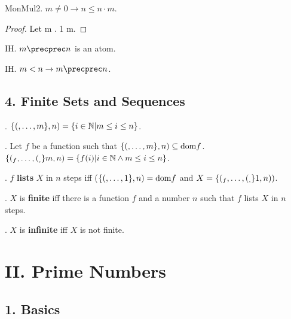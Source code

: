 \begin{axiom}
\begin{lemma}
\begin{lemma} MonMul2. $m \neq 0 \rightarrow n \leq n \cdot m$.
\end{lemma}
\begin{proof}
Let m .
1 \leq m.
\end{proof}

\begin{signature} IH. $m \precprec n$ is an atom.
\end{signature}

\begin{axiom} IH. $m < n \rightarrow m \precprec n$. \end{axiom}

\subsection{4. Finite Sets and Sequences}

\begin{definition}. 
$\{(,\dots,m\},n) = \{ i \in {\Bbb N} | m \leq i \leq n \}$.
\end{definition}


\begin{definition}. 
Let $f$ be a function such that 
$\{(,\dots,m\},n) \subseteq \text{dom} f$. 
$\{(_{f},\dots,(_{,}\}m,n) = \{ f(i) | i \in {\Bbb N} \wedge m \leq i \leq n \}$.
\end{definition}

\begin{definition}. $f$ {\bf lists} $X$ in $n$ steps iff 
($\{(,\dots,1\},n) = \text{dom} f$ and $X = \{(_{f},\dots,(_{,}\}1,n))$.
\end{definition}

\begin{definition}. $X$ is {\bf finite} iff there is a function
$f$ and a number $n$ such that $f$ lists $X$ in $n$ steps.
\end{definition}

\begin{definition}. $X$ is {\bf infinite} iff $X$ is not finite.

\section{II. Prime Numbers}

\subsection{1. Basics}


\end{definition}
\end{lemma}
\end{axiom}
